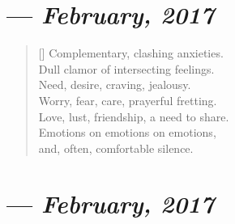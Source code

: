 \section{--- \textit{February, 2017}}

\begin{verse}[\textwidth]
  Complementary, clashing anxieties.\\
  Dull clamor of intersecting feelings.\\
  Need, desire, craving, jealousy.\\
  Worry, fear, care, prayerful fretting.\\
  Love, lust, friendship, a need to share.\\
  Emotions on emotions on emotions,\\
  and, often, comfortable silence.
\end{verse}
\newpage

\section{--- \textit{February, 2017}}

